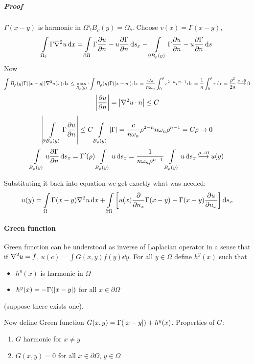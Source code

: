 \subparagraph{Proof}
$\Gamma(x-y)$ is harmonic in $\Omega \setminus B_\rho(y) = \Omega_\delta$.
Choose $v(x) = \Gamma(x-y)$,
$$\int\limits_{\Omega_\delta} \Gamma\laplacian{u} \dd{x} = \int\limits_{\partial \Omega} \Gamma \pdv{u}{n} - u \pdv{\Gamma}{n} \dd{s_x} -  \int\limits_{\partial B_\rho(y)} \Gamma \pdv{u}{n} - u \pdv{\Gamma}{n} \dd{s} $$
Now
$$\int\limits{B_\rho(y)} \Gamma(\abs{x-y}) \laplacian{u(x)} \dd{x} \leq \max\limits_{B_\rho(y)} \cdot \int\limits{B_\rho(y)} \Gamma(\abs{x-y})  \dd{x} = \frac{\omega_n}{n\omega_n} \int_0^\rho r^{2-n}r^{n-1} \dd{r} = \frac{1}{n} \int_0^\rho  r \dd{r} = \frac{\rho^2}{2n} \stackrel{\rho\to 0}{\longrightarrow} 0 $$
$$\abs{\pdv{u}{n}} = \abs{\laplacian{u} \cdot n} \leq C $$
$$\abs{ \int\limits_{\partial B_\rho(y)} \Gamma \pdv{u}{n}} \leq C \int\limits_{B_\rho(y)} \abs{\Gamma} = \frac{c}{n\omega_n} \rho^{2-n} n\omega_n \rho^{n-1} =C \rho \to 0$$
$$\int\limits_{B_\rho(y)} u \pdv{\Gamma}{n} \dd{s_x} = \Gamma'(\rho)\int\limits_{B_\rho(y)} u \dd{s_x} = \frac{1}{n\omega_n \rho^{n-1}} \int\limits_{B_\rho(y)} u \dd{s_x}\stackrel{\rho\to 0}{\longrightarrow} u(y) $$

Substituting it back into equation we get exactly what was needed:
$$u(y) = \int\limits_{\Omega} \Gamma(x-y) \laplacian{u} \dd{x} + \int\limits_{\partial \Omega} \qty[u(x) \pdv{n_x}\Gamma(x-y) - \Gamma(x-y) \pdv{u}{n_x}] \dd{s_x}$$

\paragraph{Green function}
 Green function can be understood as inverse of Laplacian operator in a sense that if $\laplacian{u} = f$, $u(c) = \int G(x,y) f(y) \dd{y}$.
For all $y\in \Omega$ define $h^y(x)$ such that
\begin{itemize}
	\item $h^y(x)$ is harmonic in $\Omega$
	\item $h^y(x) = -\Gamma(\abs{x-y})$ for all $x\in \partial \Omega$ 
\end{itemize}
(suppose there exists one).

Now define Green function $G(x,y) = \Gamma(\abs{x-y}) + h^y(x)$. Properties of $G$:
\begin{enumerate}
	\item $G$ harmonic for $x\neq y$
	\item $G(x,y) = 0$ for all $x\in \partial \Omega$, $y\in \Omega$
\end{enumerate}

